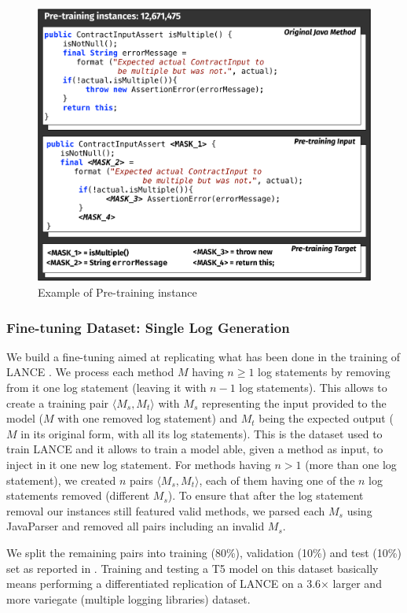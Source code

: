 \begin{figure}[h!]
	\includegraphics[width=0.70\columnwidth]{img/pre-training.pdf}
	\caption{Example of Pre-training instance}
	\label{fig:pre-training}
\end{figure}



\subsubsection{Fine-tuning Dataset: Single Log Generation} \label{sec:single-log-dataset}
We build a fine-tuning aimed at replicating what has been done in the training of LANCE \cite{mastropaolo2022using}. We process each method $M$ having $n \geq 1$ log statements by removing from it one log statement (\ie leaving it with $n-1$ log statements). This allows to create a training pair $\langle M_s, M_t \rangle$ with $M_s$ representing the input provided to the model (\ie $M$ with one removed log statement) and  $M_t$ being the expected output (\ie $M$ in its original form, with all its log statements). This is the dataset used to train LANCE \cite{mastropaolo2022using} and it allows to train a model able, given a \java method as input, to inject in it one new log statement. For methods having $n > 1$ (\ie more than one log statement), we created $n$ pairs $\langle M_s, M_t \rangle$, each of them having one of the $n$ log statements removed (\ie different $M_s$). To ensure that after the log statement removal our instances still featured valid \java methods, we parsed each $M_s$ using JavaParser \cite{javaparser} and removed all pairs including an invalid $M_s$. 

We split the remaining pairs into training (80\%), validation (10\%) and test (10\%) set as reported in . Training and testing a T5 model on this dataset basically means performing a differentiated replication of LANCE on a 3.6$\times$ larger and more variegate (multiple logging libraries) dataset.

